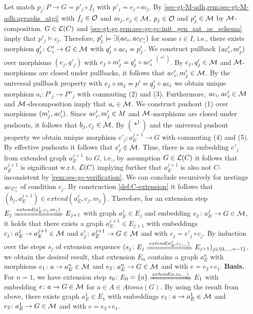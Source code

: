 Let match $p_j\colon P \to G=p'_j \circ f_j$ with $p'_j=e_j \circ m_j$.
By \cref{sec-gt-M-adh,rem:sec-gt-M-adh:agraphs_atgi} with $f_j \in {\cal O}$ and $m_j,e_j \in {\cal M}$, $p_j \in {\cal O}$ and $p'_j \in {\cal M}$ by ${\cal M}$-composition.
$G \in \mathcal{L}(C)$ and \cref{sec-gt-gc,rem:sec-gc-gc:init_gen_sat_ac_schema} imply that $p'_j \models c_j$.
Therefore, $p'_j \models \exists(\mathit{ac}_i, \mathit{ac}_{C'_i})$ for some $i \in I$, i.e., there exists morphism $q'_j\colon C_i' \to G \in {\cal M}$ with $q'_j \circ \mathit{ac}_i=p'_j$.
We construct pullback $(\mathit{ac}'_i,m'_j)$ over morphisms $(e_j,q'_j)$ with $e_j \circ m'_j=q'_j \circ \mathit{ac}'_i$ $^{(*^1)}$.
By $e_j,q'_j \in {\cal M}$ and ${\cal M}$-morphisms are closed under pullbacks, it follows that $\mathit{ac}'_i,m'_j \in {\cal M}$. 
By the universal pullback property with $e_j \circ m_j=p'=q'_j \circ \mathit{ac}_i$ we obtain unique morphism $a_i\colon P'_j \to P''_j$ with commuting (2) and (3).
Furthermore, $\mathit{ac}_i,\mathit{ac}'_i \in {\cal M}$ and ${\cal M}$-decomposition imply that $a_i \in {\cal M}$.
We construct pushout (1) over morphisms $(m'_j,\mathit{ac}'_i)$.
Since $\mathit{ac}'_i,m'_j \in M$ and ${\cal M}$-morphisms are closed under pushouts, it follows that $b_j,c_j \in {\cal M}$.
By $(*^1)$ and the universal pushout property we obtain unique morphism $e'_j\colon a_E^{j+1} \to G$ with commuting (4) and (5).
By effective pushouts it follows that $e'_j \in {\cal M}$.
Thus, there is an embedding $e'_j$ from extended graph $a_E^{j+1}$ to $G$, i.e., by assumption $G \in \mathcal{L}(C)$ it follows that $a_E^{j+1}$ is significant w.r.t. $\mathcal{L}(C)$ implying further that $a_E^{j+1}$ is also not $C$-inconsistent by \cref{rem:sec-gc-verification}.
We can conclude recursively for nestings $\mathit{ac}_{C'_i}$ of condition $c_j$.
By construction \cref{def:C-extension} it follows that $(b_j,a_E^{j+1}) \in extend(a_E^j,c_j,m_j)$.
Therefore, for an extension step $E_j \Trans{extend(a_E^j,c_j,m_j)} E_{j+1}$ with graph $a_E^j \in E_j$ and embedding $e_j\colon a_E^j \to G \in {\cal M}$, it holds that there exists a graph $a_E^{j+1} \in E_{j+1}$ with embeddings $c_j\colon a_E^j \to a_E^{j+1} \in {\cal M}$ and $e'_j\colon a_E^{j+1} \to G \in {\cal M}$ and with $e_j=e'_j \circ c_j$.
By induction over the steps $s_j$ of extension sequence $(s_j\colon E_j \Trans{extend(a_E^j,c_j,\_)} E_{j+1})_{j \in \{0,\ldots,n-1\}}$, we obtain the desired result, that extension $E_n$ contains a graph $a_E^n$ with morphisms $e_1\colon a \to a_E^n \in {\cal M}$ and $e_2\colon a_E^n \to G \in {\cal M}$ and with $e=e_2 \circ e_1$.
\textbf{Basis.} For $n=1$, we have extension step $s_0\colon E_0=\{a\} \Trans{extend(a,c_0,\_)} E_1$ with embedding $e\colon a \to G \in {\cal M}$ for $a \in A \in Atoms(G)$.
By using the result from above, there exists graph $a_E^1 \in E_1$ with embeddings $e_1\colon a \to a_E^1 \in {\cal M}$ and $e_2\colon a_E^1 \to G \in {\cal M}$ and with $e=e_2 \circ e_1$.
